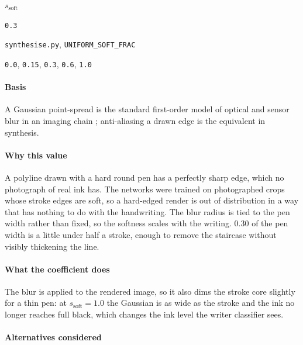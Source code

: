 \begin{description}[leftmargin=5.2em,style=sameline]

\item[Symbol] $s_{\text{soft}}$

\item[Value] \texttt{0.3}

\item[Source] \texttt{synthesise.py}, \texttt{UNIFORM\_SOFT\_FRAC}

\item[Swept] \texttt{0.0}, \texttt{0.15}, \texttt{0.3}, \texttt{0.6}, \texttt{1.0}

\end{description}

\paragraph{Basis}

A Gaussian point-spread is the standard first-order model of optical and sensor blur in an imaging chain \cite{itu601}; anti-aliasing a drawn edge is the equivalent in synthesis.

\paragraph{Why this value}

A polyline drawn with a hard round pen has a perfectly sharp edge, which no photograph of real ink has. The networks were trained on photographed crops whose stroke edges are soft, so a hard-edged render is out of distribution in a way that has nothing to do with the handwriting. The blur radius is tied to the pen width rather than fixed, so the softness scales with the writing. $0.30$ of the pen width is a little under half a stroke, enough to remove the staircase without visibly thickening the line.

\paragraph{What the coefficient does}

The blur is applied to the rendered image, so it also dims the stroke core slightly for a thin pen: at $s_{\text{soft}} = 1.0$ the Gaussian is as wide as the stroke and the ink no longer reaches full black, which changes the ink level the writer classifier sees.

\paragraph{Alternatives considered}

